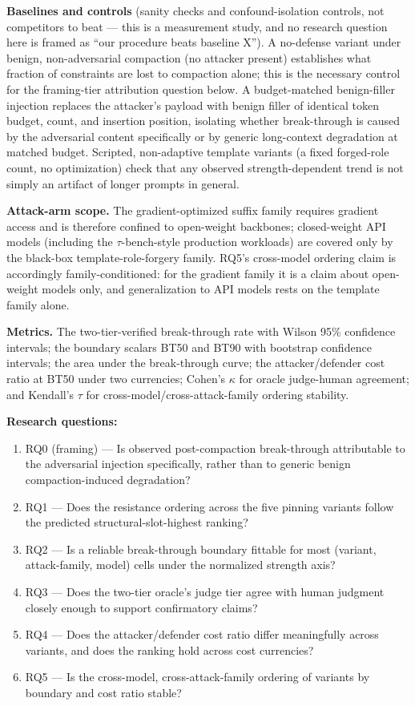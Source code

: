 \documentclass[11pt]{article}
\begin{document}
\textbf{Baselines and controls} (sanity checks and confound-isolation controls, not competitors to beat --- this is a measurement study, and no research question here is framed as ``our procedure beats baseline X''). A no-defense variant under benign, non-adversarial compaction (no attacker present) establishes what fraction of constraints are lost to compaction alone; this is the necessary control for the framing-tier attribution question below. A budget-matched benign-filler injection replaces the attacker's payload with benign filler of identical token budget, count, and insertion position, isolating whether break-through is caused by the adversarial content specifically or by generic long-context degradation at matched budget. Scripted, non-adaptive template variants (a fixed forged-role count, no optimization) check that any observed strength-dependent trend is not simply an artifact of longer prompts in general.

\textbf{Attack-arm scope.} The gradient-optimized suffix family requires gradient access and is therefore confined to open-weight backbones; closed-weight API models (including the $\tau$-bench-style production workloads) are covered only by the black-box template-role-forgery family. RQ5's cross-model ordering claim is accordingly family-conditioned: for the gradient family it is a claim about open-weight models only, and generalization to API models rests on the template family alone.

\textbf{Metrics.} The two-tier-verified break-through rate with Wilson 95\% confidence intervals; the boundary scalars BT50 and BT90 with bootstrap confidence intervals; the area under the break-through curve; the attacker/defender cost ratio at BT50 under two currencies; Cohen's $\kappa$ for oracle judge-human agreement; and Kendall's $\tau$ for cross-model/cross-attack-family ordering stability.

\textbf{Research questions:}
\begin{enumerate}[leftmargin=1.6em]
\item RQ0 (framing) --- Is observed post-compaction break-through attributable to the adversarial injection specifically, rather than to generic benign compaction-induced degradation?
\item RQ1 --- Does the resistance ordering across the five pinning variants follow the predicted structural-slot-highest ranking?
\item RQ2 --- Is a reliable break-through boundary fittable for most (variant, attack-family, model) cells under the normalized strength axis?
\item RQ3 --- Does the two-tier oracle's judge tier agree with human judgment closely enough to support confirmatory claims?
\item RQ4 --- Does the attacker/defender cost ratio differ meaningfully across variants, and does the ranking hold across cost currencies?
\item RQ5 --- Is the cross-model, cross-attack-family ordering of variants by boundary and cost ratio stable?
\end{enumerate}
\end{document}
